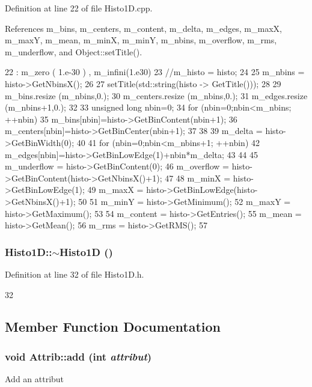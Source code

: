 Definition at line 22 of file Histo1D.cpp.

References m\_\-bins, m\_\-centers, m\_\-content, m\_\-delta, m\_\-edges, m\_\-maxX, m\_\-maxY, m\_\-mean, m\_\-minX, m\_\-minY, m\_\-nbins, m\_\-overflow, m\_\-rms, m\_\-underflow, and Object::setTitle().


\begin{DoxyCode}
22                               : m_zero ( 1.e-30 ) , m_infini(1.e30) {
23   //m_histo = histo; 
24   
25   m_nbins = histo->GetNbinsX();
26 
27   setTitle(std::string(histo -> GetTitle()));
28 
29   m_bins.resize (m_nbins,0.);
30   m_centers.resize (m_nbins,0.);
31   m_edges.resize (m_nbins+1,0.);
32 
33   unsigned long nbin=0;
34   for (nbin=0;nbin<m_nbins; ++nbin){
35     m_bins[nbin]=histo->GetBinContent(nbin+1);
36     m_centers[nbin]=histo->GetBinCenter(nbin+1);
37   }
38 
39   m_delta = histo->GetBinWidth(0);
40 
41   for (nbin=0;nbin<m_nbins+1; ++nbin){
42     m_edges[nbin]=histo->GetBinLowEdge(1)+nbin*m_delta;
43   }
44 
45   m_underflow = histo->GetBinContent(0);
46   m_overflow = histo->GetBinContent(histo->GetNbinsX()+1);  
47 
48   m_minX = histo->GetBinLowEdge(1);
49   m_maxX = histo->GetBinLowEdge(histo->GetNbinsX()+1);
50 
51   m_minY = histo->GetMinimum();
52   m_maxY = histo->GetMaximum();
53 
54   m_content = histo->GetEntries();
55   m_mean    = histo->GetMean();
56   m_rms     = histo->GetRMS();
57 }
\end{DoxyCode}
\hypertarget{classHisto1D_af62825fd9266c1903d403e489501daa9}{
\subsubsection[{$\sim$Histo1D}]{\setlength{\rightskip}{0pt plus 5cm}Histo1D::$\sim$Histo1D ()}}
\label{classHisto1D_af62825fd9266c1903d403e489501daa9}


Definition at line 32 of file Histo1D.h.


\begin{DoxyCode}
32 { }
\end{DoxyCode}


\subsection{Member Function Documentation}
\hypertarget{classAttrib_a235f773af19c900264a190b00a3b4ad7}{
\subsubsection[{add}]{\setlength{\rightskip}{0pt plus 5cm}void Attrib::add (int {\em attribut})}}
\label{classAttrib_a235f773af19c900264a190b00a3b4ad7}
Add an attribut 


